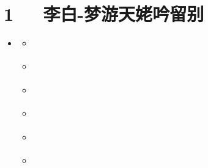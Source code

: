 \documentclass[letterpaper,12pt,english]{sphinxmanual}
\begin{document}
\chapter{1   李白-梦游天姥吟留别}
\label{\detokenize{p01_u6563_u6587/_u674e_u767d-_u68a6_u6e38_u5929_u59e5_u541f_u7559_u522b:id1}}\label{\detokenize{p01_u6563_u6587/_u674e_u767d-_u68a6_u6e38_u5929_u59e5_u541f_u7559_u522b::doc}}
\begin{sphinxShadowBox}
\begin{itemize}
\item {} 
\label{\detokenize{p01_u6563_u6587/_u674e_u767d-_u68a6_u6e38_u5929_u59e5_u541f_u7559_u522b:id10}}{\hyperref[\detokenize{p01_u6563_u6587/_u674e_u767d-_u68a6_u6e38_u5929_u59e5_u541f_u7559_u522b:id1}]{}}
\begin{itemize}
\item {} 
\label{\detokenize{p01_u6563_u6587/_u674e_u767d-_u68a6_u6e38_u5929_u59e5_u541f_u7559_u522b:id11}}{\hyperref[\detokenize{p01_u6563_u6587/_u674e_u767d-_u68a6_u6e38_u5929_u59e5_u541f_u7559_u522b:id3}]{}}

\item {} 
\label{\detokenize{p01_u6563_u6587/_u674e_u767d-_u68a6_u6e38_u5929_u59e5_u541f_u7559_u522b:id12}}{\hyperref[\detokenize{p01_u6563_u6587/_u674e_u767d-_u68a6_u6e38_u5929_u59e5_u541f_u7559_u522b:id4}]{}}

\item {} 
\label{\detokenize{p01_u6563_u6587/_u674e_u767d-_u68a6_u6e38_u5929_u59e5_u541f_u7559_u522b:id13}}{\hyperref[\detokenize{p01_u6563_u6587/_u674e_u767d-_u68a6_u6e38_u5929_u59e5_u541f_u7559_u522b:id5}]{}}

\item {} 
\label{\detokenize{p01_u6563_u6587/_u674e_u767d-_u68a6_u6e38_u5929_u59e5_u541f_u7559_u522b:id14}}{\hyperref[\detokenize{p01_u6563_u6587/_u674e_u767d-_u68a6_u6e38_u5929_u59e5_u541f_u7559_u522b:id6}]{}}

\item {} 
\label{\detokenize{p01_u6563_u6587/_u674e_u767d-_u68a6_u6e38_u5929_u59e5_u541f_u7559_u522b:id15}}{\hyperref[\detokenize{p01_u6563_u6587/_u674e_u767d-_u68a6_u6e38_u5929_u59e5_u541f_u7559_u522b:id7}]{}}

\item {} 
\label{\detokenize{p01_u6563_u6587/_u674e_u767d-_u68a6_u6e38_u5929_u59e5_u541f_u7559_u522b:id16}}{\hyperref[\detokenize{p01_u6563_u6587/_u674e_u767d-_u68a6_u6e38_u5929_u59e5_u541f_u7559_u522b:id8}]{}}


\end{itemize}
\end{itemize}
\end{sphinxShadowBox}
\end{document}
